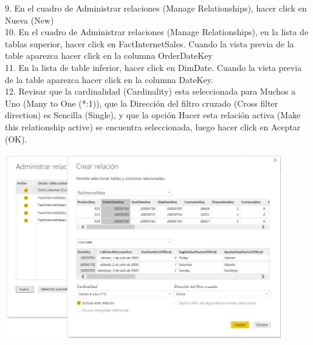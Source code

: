       
\begin{itemize}
    9.  En el cuadro de Administrar relaciones (Manage Relationships), hacer click en Nueva (New)\\
    10.  En el cuadro de Administrar relaciones (Manage Relationships), en la lista de tablas superior, hacer         click en FactInternetSales. Cuando la vista previa de la table aparezca hacer click en la columna            OrderDateKey\\
    11. En la lista de table inferior, hacer click en DimDate. Cuando la vista previa de la table aparezca hacer     click en la columna DateKey.\\
    12. Revisar que la cardinalidad (Cardinality) esta seleccionada para Muchos a Uno (Many to One (*:1)), que la
Dirección del filtro cruzado (Cross filter direction) es Sencilla (Single), y que la opción Hacer esta relación
activa (Make this relationship active) se encuentra seleccionada, luego hacer click en Aceptar (OK).\\

\end{itemize} 

\begin{center}
\includegraphics[width=12cm]{./Imagenes/img9-12} 
\end{center}
    
    
        

